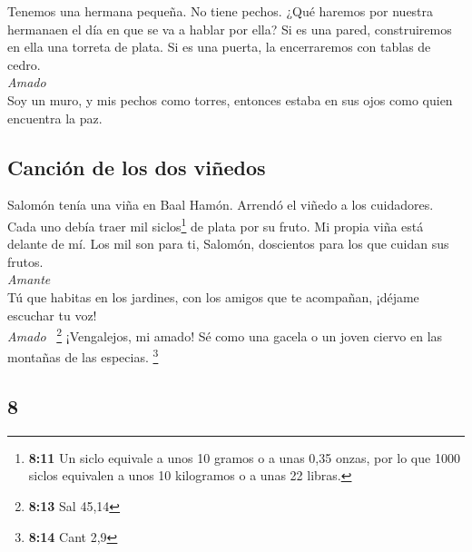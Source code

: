 \begin{paracol}{2}
 Tenemos una hermana pequeña. No tiene pechos. ¿Qué
haremos por nuestra hermanaen el día en que se va a hablar por ella?
 Si es una pared, construiremos en ella una torreta de
plata. Si es una puerta, la encerraremos con tablas de cedro.\\
\emph{Amado}\\
 Soy un muro, y mis pechos como torres, entonces estaba
en sus ojos como quien encuentra la paz.

\hypertarget{canciuxf3n-de-los-dos-viuxf1edos}{%
\subsection{Canción de los dos
viñedos}\label{canciuxf3n-de-los-dos-viuxf1edos}}

 Salomón tenía una viña en Baal Hamón. Arrendó el viñedo
a los cuidadores. Cada uno debía traer mil siclos\footnote{\textbf{8:11}
  Un siclo equivale a unos 10 gramos o a unas 0,35 onzas, por lo que
  1000 siclos equivalen a unos 10 kilogramos o a unas 22 libras.} de
plata por su fruto.  Mi propia viña está delante de mí.
Los mil son para ti, Salomón, doscientos para los que cuidan sus
frutos.\\
\emph{Amante}\\
 Tú que habitas en los jardines, con los amigos que te
acompañan, ¡déjame escuchar tu voz!\\
\emph{Amado} ~\footnote{\textbf{8:13} Sal 45,14} 
¡Vengalejos, mi amado! Sé como una gacela o un joven ciervo en las
montañas de las especias. \footnote{\textbf{8:14} Cant 2,9}
\switchcolumn \begin{otherlanguage}{english}

\hypertarget{section-15}{%
\section{8}\label{section-15}}


\end{otherlanguage}
\end{paracol}
